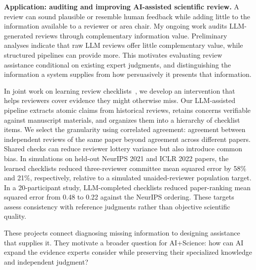 \textbf{Application: auditing and improving AI-assisted scientific review.}
A review can sound plausible or resemble human feedback while adding little to the information available to a reviewer or area chair.
My ongoing work audits LLM-generated reviews through complementary information value.
Preliminary analyses indicate that raw LLM reviews offer little complementary value, while structured pipelines can provide more.
This motivates evaluating review assistance conditional on existing expert judgments, and distinguishing the information a system supplies from how persuasively it presents that information.

In joint work on learning review checklists~\cite{liu2026checklists}, we develop an intervention that helps reviewers cover evidence they might otherwise miss.
Our LLM-assisted pipeline extracts atomic claims from historical reviews, retains concerns verifiable against manuscript materials, and organizes them into a hierarchy of checklist items.
We select the granularity using correlated agreement: agreement between independent reviews of the same paper beyond agreement across different papers.
Shared checks can reduce reviewer lottery variance but also introduce common bias.
In simulations on held-out NeurIPS 2021 and ICLR 2022 papers, the learned checklists reduced three-reviewer committee mean squared error by 58\% and 21\%, respectively, relative to a simulated unaided-reviewer population target.
In a 20-participant study, LLM-completed checklists reduced paper-ranking mean squared error from 0.48 to 0.22 against the NeurIPS ordering.
These targets assess consistency with reference judgments rather than objective scientific quality.

These projects connect diagnosing missing information to designing assistance that supplies it.
They motivate a broader question for AI+Science: how can AI expand the evidence experts consider while preserving their specialized knowledge and independent judgment?
